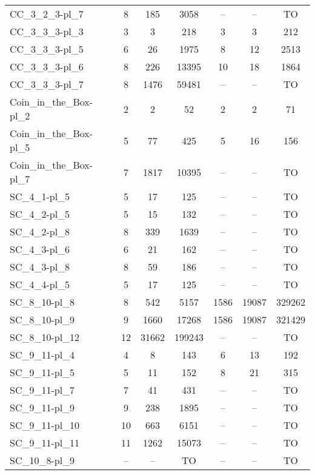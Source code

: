 \documentclass{article}
\newcommand{\unsolvedColumn}{--}
\newcommand{\myTO}{TO}
\begin{document}
\begin{longtable}[!ht]{l|ccc|ccc}
CC\_3\_2\_3-pl\_7 & 8 & 185 & 3058 & \unsolvedColumn & \unsolvedColumn & \myTO \\
CC\_3\_3\_3-pl\_3 & 3 & 3 & 218 & 3 & 3 & 212 \\
CC\_3\_3\_3-pl\_5 & 6 & 26 & 1975 & 8 & 12 & 2513 \\
CC\_3\_3\_3-pl\_6 & 8 & 226 & 13395 & 10 & 18 & 1864 \\
CC\_3\_3\_3-pl\_7 & 8 & 1476 & 59481 & \unsolvedColumn & \unsolvedColumn & \myTO \\
Coin\_in\_the\_Box-pl\_2 & 2 & 2 & 52 & 2 & 2 & 71 \\
Coin\_in\_the\_Box-pl\_5 & 5 & 77 & 425 & 5 & 16 & 156 \\
Coin\_in\_the\_Box-pl\_7 & 7 & 1817 & 10395 & \unsolvedColumn & \unsolvedColumn & \myTO \\
SC\_4\_1-pl\_5 & 5 & 17 & 125 & \unsolvedColumn & \unsolvedColumn & \myTO \\
SC\_4\_2-pl\_5 & 5 & 15 & 132 & \unsolvedColumn & \unsolvedColumn & \myTO \\
SC\_4\_2-pl\_8 & 8 & 339 & 1639 & \unsolvedColumn & \unsolvedColumn & \myTO \\
SC\_4\_3-pl\_6 & 6 & 21 & 162 & \unsolvedColumn & \unsolvedColumn & \myTO \\
SC\_4\_3-pl\_8 & 8 & 59 & 186 & \unsolvedColumn & \unsolvedColumn & \myTO \\
SC\_4\_4-pl\_5 & 5 & 17 & 125 & \unsolvedColumn & \unsolvedColumn & \myTO \\
SC\_8\_10-pl\_8 & 8 & 542 & 5157 & 1586 & 19087 & 329262 \\
SC\_8\_10-pl\_9 & 9 & 1660 & 17268 & 1586 & 19087 & 321429 \\
SC\_8\_10-pl\_12 & 12 & 31662 & 199243 & \unsolvedColumn & \unsolvedColumn & \myTO \\
SC\_9\_11-pl\_4 & 4 & 8 & 143 & 6 & 13 & 192 \\
SC\_9\_11-pl\_5 & 5 & 11 & 152 & 8 & 21 & 315 \\
SC\_9\_11-pl\_7 & 7 & 41 & 431 & \unsolvedColumn & \unsolvedColumn & \myTO \\
SC\_9\_11-pl\_9 & 9 & 238 & 1895 & \unsolvedColumn & \unsolvedColumn & \myTO \\
SC\_9\_11-pl\_10 & 10 & 663 & 6151 & \unsolvedColumn & \unsolvedColumn & \myTO \\
SC\_9\_11-pl\_11 & 11 & 1262 & 15073 & \unsolvedColumn & \unsolvedColumn & \myTO \\
SC\_10\_8-pl\_9 & \unsolvedColumn & \unsolvedColumn & \myTO & \unsolvedColumn & \unsolvedColumn & \myTO \\

\end{longtable}
\end{document}
